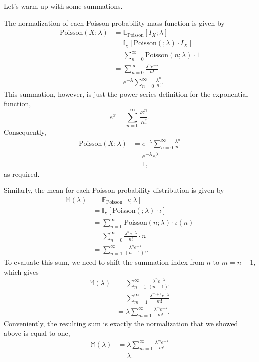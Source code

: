 \documentclass[
  letterpaper,
  DIV=11,
  numbers=noendperiod]{scrartcl}
\begin{document}
Let's warm up with some summations.

The normalization of each Poisson probability mass function is given by
\begin{align*}
\mathrm{Poisson}(X; \lambda)
&= \mathbb{E}_{\mathrm{Poisson}}[ I_{X}; \lambda ]
\\
&= \mathbb{I}_{\chi}[ \mathrm{Poisson}( ; \lambda) \cdot I_{X} ]
\\
&= \sum_{n = 0}^{\infty} \mathrm{Poisson}(n; \lambda) \cdot 1
\\
&= \sum_{n = 0}^{\infty} \frac{ \lambda^{n} e^{-\lambda} }{ n! }
\\
&= e^{-\lambda} \sum_{n = 0}^{\infty} \frac{ \lambda^{n} }{ n! }.
\end{align*} This summation, however, is just the power series
definition for the exponential function, \[
e^{x} = \sum_{n = 0}^{\infty} \frac{ x^{n} }{ n! }.
\] Consequently, \begin{align*}
\mathrm{Poisson}(X; \lambda)
&= e^{-\lambda} \sum_{n = 0}^{\infty} \frac{ \lambda^{n} }{ n! }
\\
&= e^{-\lambda} e^{\lambda}
\\
&= 1,
\end{align*} as required.

Similarly, the mean for each Poisson probability distribution is given
by \begin{align*}
\mathbb{M}(\lambda)
&= \mathbb{E}_{\mathrm{Poisson}} [ \iota ; \lambda ]
\\
&=
\mathbb{I}_{\chi} [ \mathrm{Poisson}( ; \lambda) \cdot \iota ]
\\
&=
\sum_{n = 0}^{\infty}
\mathrm{Poisson}(n; \lambda) \cdot \iota(n)
\\
&=
\sum_{n = 0}^{\infty}
\frac{ \lambda^{n} e^{-\lambda} }{ n! } \cdot n
\\
&=
\sum_{n = 1}^{\infty}
\frac{ \lambda^{n} e^{-\lambda} }{ (n - 1)! }.
\end{align*} To evaluate this sum, we need to shift the summation index
from \(n\) to \(m = n - 1\), which gives \begin{align*}
\mathbb{M}(\lambda)
&=
\sum_{n = 1}^{\infty}
\frac{ \lambda^{n} e^{-\lambda} }{ (n - 1)! }
\\
&=
\sum_{m = 1}^{\infty}
\frac{ \lambda^{m + 1} e^{-\lambda} }{ m! }
\\
&=
\lambda \sum_{m = 1}^{\infty}
\frac{ \lambda^{m} e^{-\lambda} }{ m! }.
\end{align*} Conveniently, the resulting sum is exactly the
normalization that we showed above is equal to one, \begin{align*}
\mathbb{M}(\lambda)
&=
\lambda \sum_{m = 1}^{\infty}
\frac{ \lambda^{m} e^{-\lambda} }{ m! }
\\
&= \lambda.
\end{align*}
\end{document}

